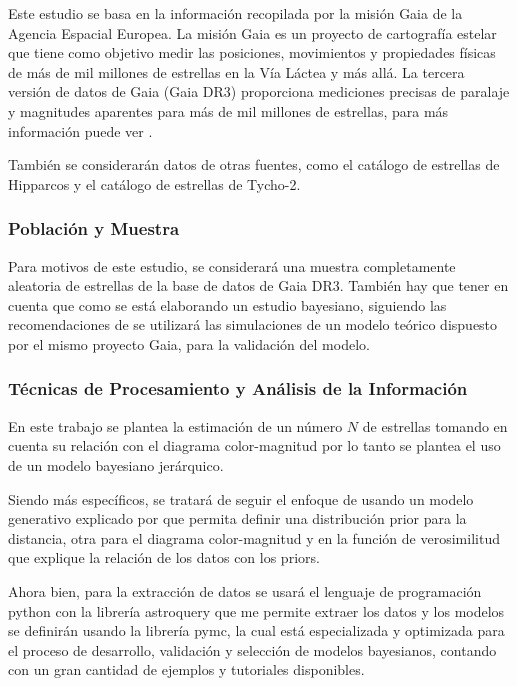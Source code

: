 \documentclass[stu, 12pt, letterpaper, donotrepeattitle, floatsintext, natbib]{apa7_ula}
\begin{document}
Este estudio se basa en la información recopilada por la misión
Gaia de la Agencia Espacial Europea. La misión Gaia es un proyecto
de cartografía estelar que tiene como objetivo medir las posiciones,
movimientos y propiedades físicas de más de mil millones de estrellas
en la Vía Láctea y más allá. La tercera versión de datos de Gaia (Gaia DR3)
proporciona mediciones precisas de paralaje y magnitudes aparentes para más
de mil millones de estrellas, para más información puede ver \citet{Vallenari2022GaiaDR}.

También se considerarán datos de otras fuentes, como el catálogo de estrellas
de Hipparcos y el catálogo de estrellas de Tycho-2.

\subsubsection{Población y Muestra}

Para motivos de este estudio, se considerará una muestra completamente
aleatoria de estrellas de la base de datos de Gaia DR3.
También hay que tener en cuenta que como se
está elaborando un estudio bayesiano, siguiendo las recomendaciones de
\citet{gelman2020bayesian} se utilizará las simulaciones de un modelo teórico
dispuesto por el mismo proyecto Gaia, para la validación del modelo.

\subsubsection{Técnicas de Procesamiento y Análisis de la Información}

En este trabajo se plantea la estimación de un número $N$ de
estrellas tomando en cuenta su relación con el diagrama color-magnitud
por lo tanto se plantea el uso de un modelo bayesiano jerárquico.

Siendo más específicos, se tratará de seguir el enfoque de \citet{Leistedt_2017}
usando un modelo generativo explicado por \citet[p, 11]{gelman2020bayesian}
que permita definir una distribución prior para la distancia, otra
para el diagrama color-magnitud y en la función de verosimilitud que
explique la relación de los datos con los priors.

Ahora bien, para la extracción de datos se usará el lenguaje de programación python
con la librería astroquery que me permite extraer los datos y los modelos se definirán
usando la librería pymc, la cual está especializada y optimizada para el proceso
de desarrollo, validación y selección de modelos bayesianos, contando con un gran
cantidad de ejemplos y tutoriales disponibles.
\end{document}
